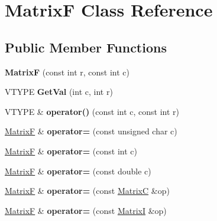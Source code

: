 \hypertarget{class_matrix_f}{\section{Matrix\+F Class Reference}
\label{class_matrix_f}
}
\subsection*{Public Member Functions}
\begin{DoxyCompactItemize}
\item 
\hypertarget{class_matrix_f_a7351e57caee16769e596dc02d1ca15fa}{{\bfseries Matrix\+F} (const int r, const int c)}\label{class_matrix_f_a7351e57caee16769e596dc02d1ca15fa}

\item 
\hypertarget{class_matrix_f_a786c41635f275e3e9a32dd4cb0130a6b}{V\+T\+Y\+P\+E {\bfseries Get\+Val} (int c, int r)}\label{class_matrix_f_a786c41635f275e3e9a32dd4cb0130a6b}

\item 
\hypertarget{class_matrix_f_aa21ea383ce13437865497e3eb0d0fc4f}{V\+T\+Y\+P\+E \& {\bfseries operator()} (const int c, const int r)}\label{class_matrix_f_aa21ea383ce13437865497e3eb0d0fc4f}

\item 
\hypertarget{class_matrix_f_a4040d01db9df660f0cd1f8fdf2ee967f}{\hyperlink{class_matrix_f}{Matrix\+F} \& {\bfseries operator=} (const unsigned char c)}\label{class_matrix_f_a4040d01db9df660f0cd1f8fdf2ee967f}

\item 
\hypertarget{class_matrix_f_a6714c95f5a04d80a2421d3cccdf2a2e1}{\hyperlink{class_matrix_f}{Matrix\+F} \& {\bfseries operator=} (const int c)}\label{class_matrix_f_a6714c95f5a04d80a2421d3cccdf2a2e1}

\item 
\hypertarget{class_matrix_f_a9e1442282dc1ee1a263340cbe3d15cab}{\hyperlink{class_matrix_f}{Matrix\+F} \& {\bfseries operator=} (const double c)}\label{class_matrix_f_a9e1442282dc1ee1a263340cbe3d15cab}

\item 
\hypertarget{class_matrix_f_a5fd7af4e1165c01e600740a79af3e962}{\hyperlink{class_matrix_f}{Matrix\+F} \& {\bfseries operator=} (const \hyperlink{class_matrix_c}{Matrix\+C} \&op)}\label{class_matrix_f_a5fd7af4e1165c01e600740a79af3e962}

\item 
\hypertarget{class_matrix_f_a99ae34f8aa10f78cd24c25a803afba88}{\hyperlink{class_matrix_f}{Matrix\+F} \& {\bfseries operator=} (const \hyperlink{class_matrix_i}{Matrix\+I} \&op)}\label{class_matrix_f_a99ae34f8aa10f78cd24c25a803afba88}


\end{DoxyCompactItemize}
